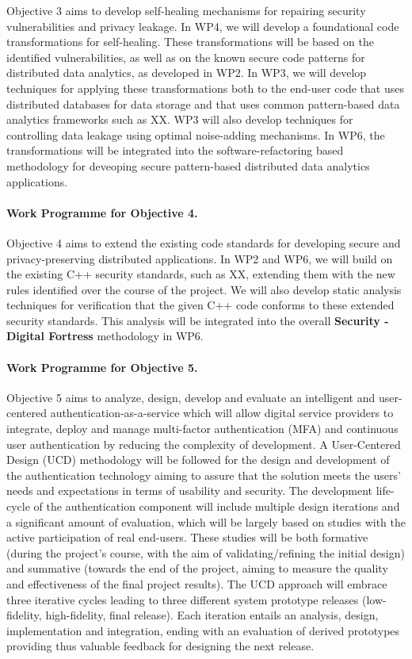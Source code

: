 \documentclass[a4paper,11pt]{article}
\newcommand{\project}[1]{\textbf{#1}\xspace}
\newcommand{\SECURITY}{\project{Security - Digital Fortress}}
\newcommand{\TheProject}{\SECURITY}
\begin{document}
Objective 3 aims to develop self-healing mechanisms for repairing security vulnerabilities and privacy leakage. In WP4, we will develop a foundational code transformations for self-healing. These transformations will be based on the identified vulnerabilities, as well as on the known secure code patterns for distributed data analytics, as developed in WP2. In WP3, we will develop techniques for applying these transformations both to the end-user code that uses distributed databases for data storage and that uses common pattern-based data analytics frameworks such as XX. WP3 will also develop techniques for controlling data leakage using optimal noise-adding mechanisms. In WP6, the transformations will be integrated into the software-refactoring based methodology for deveoping secure pattern-based distributed data analytics applications. 

\paragraph{Work Programme for Objective 4.}

Objective 4 aims to extend the existing code standards for developing secure and privacy-preserving distributed applications. In WP2 and WP6, we will build on the existing C++ security standards, such as XX, extending them with the new rules identified over the course of the project. We will also develop static analysis techniques for verification that the given C++ code conforms to these extended security standards. This analysis will be integrated into the overall \TheProject{} methodology in WP6.

\paragraph{Work Programme for Objective 5.}

Objective 5 aims to analyze, design, develop and evaluate an intelligent and user-centered authentication-as-a-service which will allow digital service providers to integrate, deploy and manage multi-factor authentication (MFA) and continuous user authentication by reducing the complexity of development. A User-Centered Design (UCD) methodology will be followed for the design and development of the authentication technology aiming to assure that the solution meets the users' needs and expectations in terms of usability and security. The development life-cycle of the authentication component will include multiple design iterations and a significant amount of evaluation, which will be largely based on studies with the active participation of real end-users. These studies will be both formative (during the project’s course, with the aim of validating/refining the initial design) and summative (towards the end of the project, aiming to measure the quality and effectiveness of the final project results). The UCD approach will embrace three iterative cycles leading to three different system prototype releases (low-fidelity, high-fidelity, final release). Each iteration entails an analysis, design, implementation and integration, ending with an evaluation of derived prototypes providing thus valuable feedback for designing the next release. 
\end{document}
